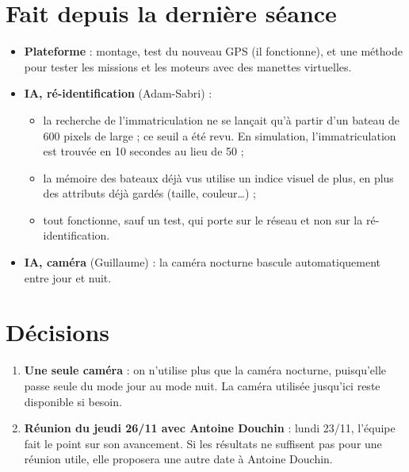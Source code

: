 \documentclass[10pt,a4paper]{article}
\begin{document}
\section{Fait depuis la dernière séance}
\begin{itemize}
  \item \textbf{Plateforme} : montage, test du nouveau GPS (il fonctionne), et une méthode pour tester les missions et les moteurs avec des manettes virtuelles.
  \item \textbf{IA, ré-identification} (Adam-Sabri) :
  \begin{itemize}
    \item la recherche de l'immatriculation ne se lançait qu'à partir d'un bateau de 600 pixels de large ; ce seuil a été revu. En simulation, l'immatriculation est trouvée en 10 secondes au lieu de 50 ;
    \item la mémoire des bateaux déjà vus utilise un indice visuel de plus, en plus des attributs déjà gardés (taille, couleur…) ;
    \item tout fonctionne, sauf un test, qui porte sur le réseau et non sur la ré-identification.
  \end{itemize}
  \item \textbf{IA, caméra} (Guillaume) : la caméra nocturne bascule automatiquement entre jour et nuit.
\end{itemize}

\section{Décisions}
\begin{enumerate}[label={\color{cExp}\bfseries\arabic*.}]
  \item \textbf{Une seule caméra} : on n'utilise plus que la caméra nocturne, puisqu'elle passe seule du mode jour au mode nuit. La caméra utilisée jusqu'ici reste disponible si besoin.
  \item \textbf{Réunion du jeudi 26/11 avec Antoine Douchin} : lundi 23/11, l'équipe fait le point sur son avancement. Si les résultats ne suffisent pas pour une réunion utile, elle proposera une autre date à Antoine Douchin.
\end{enumerate}
\end{document}
